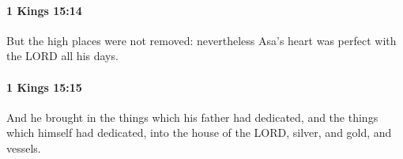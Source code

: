 		\paragraph{1 Kings 15:14} %
			\label{1KINGS-15-14}

			But the high places were not removed: nevertheless Asa’s heart was perfect with the LORD all his days.


		\paragraph{1 Kings 15:15} %
			\label{1KINGS-15-15}

			And he brought in the things which his father had dedicated, and the things which himself had dedicated, into the house of the LORD, silver, and gold, and vessels.



